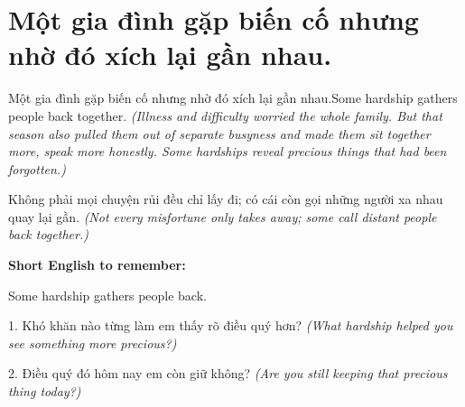 \section{Một gia đình gặp biến cố nhưng nhờ đó xích lại gần nhau.}
\begin{truyen}{Một gia đình gặp biến cố nhưng nhờ đó xích lại gần nhau.}{Some hardship gathers people back together.}
\textit{(Illness and difficulty worried the whole family. But that season also pulled them out of separate busyness and made them sit together more, speak more honestly. Some hardships reveal precious things that had been forgotten.)}
\end{truyen}
\begin{baihoc}
Không phải mọi chuyện rủi đều chỉ lấy đi; có cái còn gọi những người xa nhau quay lại gần.
\textit{(Not every misfortune only takes away; some call distant people back together.)}
\end{baihoc}
\begin{ghinhoanh}
\textbf{Short English to remember:}

Some hardship gathers people back.
\end{ghinhoanh}
\begin{tuhocnhanh}
1. Khó khăn nào từng làm em thấy rõ điều quý hơn? \textit{(What hardship helped you see something more precious?)}

2. Điều quý đó hôm nay em còn giữ không? \textit{(Are you still keeping that precious thing today?)}
\end{tuhocnhanh}
\ngancach